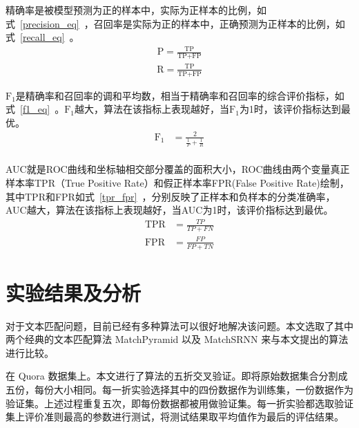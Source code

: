 精确率是被模型预测为正的样本中，实际为正样本的比例，如式~\eqref{precision_eq}~，召回率是实际为正的样本中，正确预测为正样本的比例，如式~\eqref{recall_eq}~。
\begin{equation}
\label{precision_eq}
\begin{aligned}
\text{P}=\frac{\text{TP}}{\text{TP}+\text{FP}}
\end{aligned}
\end{equation}
\begin{equation}
\label{recall_eq}
\begin{aligned}
\text{R}=\frac{\text{TP}}{\text{TP}+\text{FP}}
\end{aligned}
\end{equation}

$\text{F}_1$是精确率和召回率的调和平均数，相当于精确率和召回率的综合评价指标，如式~\eqref{f1_eq}~。$\text{F}_1$越大，算法在该指标上表现越好，当$\text{F}_1$为1时，该评价指标达到最优。
\begin{equation}
\label{f1_eq}
\begin{aligned}
\text{F}_1 &= \frac{2}{\frac{1}{P}+\frac{1}{R}} \\
\end{aligned}
\end{equation}

AUC就是ROC曲线和坐标轴相交部分覆盖的面积大小，ROC曲线由两个变量真正样本率TPR（True Positive Rate）和假正样本率FPR(False Positive Rate)绘制，其中TPR和FPR如式~\eqref{tpr_fpr}~，分别反映了正样本和负样本的分类准确率，AUC越大，算法在该指标上表现越好，当AUC为1时，该评价指标达到最优。
\begin{equation}
\label{tpr_fpr}
\begin{aligned}
\text{TPR} &= \frac{TP}{TP+FN} \\
\text{FPR} &= \frac{FP}{FP+TN}
\end{aligned}
\end{equation}


\section{实验结果及分析}
\label{sec:lab_value}
对于文本匹配问题，目前已经有多种算法可以很好地解决该问题。本文选取了其中两个经典的文本匹配算法 MatchPyramid\cite{Pang2016TextMA} 以及 MatchSRNN\cite{Wan2016MatchSRNNMT} 来与本文提出的算法进行比较。

在 Quora 数据集上。本文进行了算法的五折交叉验证。即将原始数据集合分割成五份，每份大小相同。每一折实验选择其中的四份数据作为训练集，一份数据作为验证集。上述过程重复五次，即每份数据都被用做验证集。每一折实验都选取验证集上评价准则最高的参数进行测试，将测试结果取平均值作为最后的评估结果。

